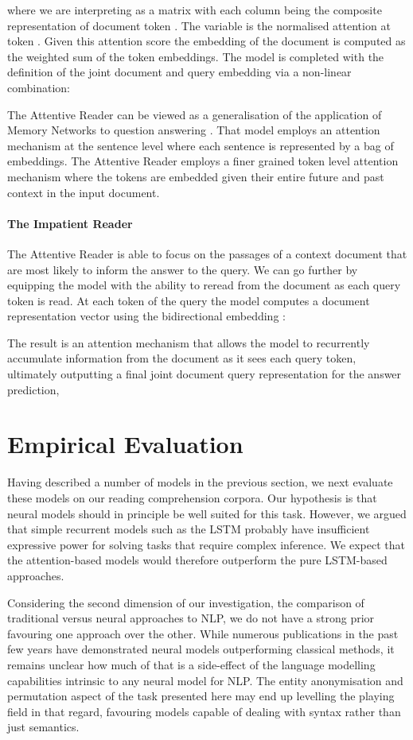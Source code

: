 \documentclass{article}
\begin{document}
where we are interpreting  as a matrix with each column being the composite
representation  of document token .
The variable  is the normalised attention at token . Given
this attention score the embedding of the document  is computed as the
weighted sum of the token embeddings.
The model is completed with the definition of the joint document and query
embedding via a non-linear combination:


The Attentive Reader can be viewed as a generalisation of the application of
Memory Networks to question answering \cite{Weston:2014:MN}. That model employs
an attention mechanism at the sentence level where each sentence is represented
by a bag of embeddings. The Attentive Reader employs a finer grained token
level attention mechanism where the tokens are embedded given their entire
future and past context in the input document.

\paragraph{The Impatient Reader}
The Attentive Reader is able to focus on the passages of a context document
that are most likely to inform the answer to the query. We can go further by
equipping the model with the ability to reread from the document as each query
token is read. At each token  of the query  the model computes a document
representation vector  using the bidirectional embedding :

The result is an attention mechanism that allows the model to recurrently
accumulate information from the document as it sees each query token, ultimately
outputting a final joint document query representation for the answer prediction,

 \section{Empirical Evaluation}
\label{experiments}


Having described a number of models in the previous section, we next evaluate
these models on our reading comprehension corpora. Our hypothesis is that neural models should in principle be well suited for this
task. However, we argued that simple recurrent models such as the LSTM
probably have insufficient expressive power for solving tasks that require
complex inference. We expect that the attention-based models would therefore
outperform the pure LSTM-based approaches.

Considering the second dimension of our investigation, the comparison of
traditional versus neural approaches to NLP, we do not have a strong prior
favouring one approach over the other. While numerous publications in the past
few years have demonstrated neural models outperforming classical methods, it
remains unclear how much of that is a side-effect of the language modelling
capabilities intrinsic to any neural model for NLP. The entity anonymisation and
permutation aspect of the task presented here may end up levelling the playing
field in that regard, favouring models capable of dealing with syntax rather
than just semantics.
\end{document}
